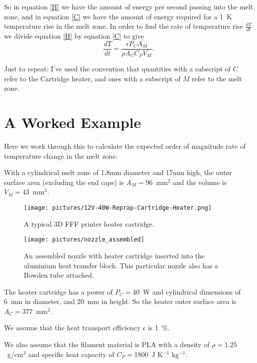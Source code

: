 So in equation \ref{H} we have the amount of energy per second passing into the melt zone, and in equation \ref{C} we have the amount of energy required for a 1~K temperature rise in the melt zone.  In order to find the rate of temperature rise $\frac{dT}{dt}$ we divide equation \ref{H} by equation \ref{C} to give 
\begin{equation}
\frac{dT}{dt} = \frac{\epsilon P_{C} A_{M} }{\rho A_{C} C_{P} V_{M}}. 
\label{T}
\end{equation}

Just to repeat: I've used the convention that quantities with a subscript of $C$ refer to the Cartridge heater, and ones with a subscript of $M$ refer to the melt zone. 

\section{A Worked Example}

Here we work through this to calculate the expected order of magnitude rate of temperature change in the melt zone. 

With a cylindrical melt zone of 1.8mm diameter and 17mm high, the outer surface area (excluding the end caps) is $A_{M} = 96$~mm$^{2}$ and the volume is $V_{M} = 43$~mm$^{3}$. 

\begin{figure}[h!!!]
\centering
\texttt{[image: pictures/12V-40W-Reprap-Cartridge-Heater.png]}
\caption{A typical 3D FFF printer heater cartridge.}
\label{fig:12V-40W-Reprap-Cartridge-Heater}
\end{figure}

\begin{figure}[h!!!]
\centering
\texttt{[image: pictures/nozzle\_assembled]}
\caption{An assembled nozzle with heater cartridge inserted into the aluminium heat transfer block. This particular nozzle also has a Bowden tube attached.}
\label{fig:nozzle_assembled}
\end{figure}


The heater cartridge has a power of $P_{C} = 40$~W and cylindrical dimensions of 6~mm in diameter, and 20~mm in height. So the heater outer surface area is $A_{C} = 377$~mm$^{2}$. 

We assume that the heat transport efficiency $\epsilon$ is 1~\%. 

We also assume that the filament material is PLA with a density of $\rho = 1.25$~g/cm$^{3}$ and specific heat capacity of $C_{P} = $1800~J K$^{-1}$ kg$^{-1}$. 

